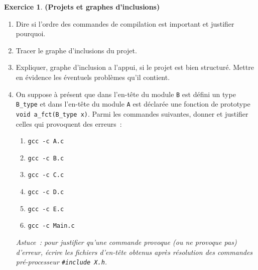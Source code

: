 \documentclass[12pt]{article}
\theoremstyle{definition}
\newtheorem{Exercice}{Exercice}
\newcommand{\Sol}[1]{}
\begin{document}
\begin{Exercice} {\bf (Projets et graphes d'inclusions)}
\begin{enumerate}
        \item Dire si l'ordre des commandes de compilation est important
        et justifier pourquoi.

        \Sol{Les six premières lignes commutent, seule la dernière est toujours
        la dernière. C'est l'éditeur de liens qui résout les symboles
        non encore connus, et c'est ce que fait la dernière ligne.}
        \smallskip

        \item Tracer le graphe d'inclusions du projet.

        \Sol{C'est le graphe à $6$ sommet où l'on a un arc de $x$ vers $y$
        si et seulement si il y a un include $y$ dans l'{\bf en-tête} de $x$
        (et non pas dans le .c).}
        \smallskip

        \item Expliquer, graphe d'inclusion a l'appui, si le projet
        est bien structuré. Mettre en évidence les éventuels problèmes
        qu'il contient.

        \Sol{Le projet est mal structuré car il y a un cycle 
        $A \to B \to D \to A$.}
        \smallskip

        \item On suppose à présent que dans l'en-tête du module {\tt B}
        est défini un type {\tt B\_type} et dans l'en-tête du module
        {\tt A} est déclarée une fonction de prototype
        {\tt void a\_fct(B\_type x)}. Parmi les commandes suivantes,
        donner et justifier celles qui provoquent des erreurs~:
        \begin{multicols}{2}
            \begin{enumerate}
                \item {\tt gcc -c A.c}
                \item {\tt gcc -c B.c}
                \item {\tt gcc -c C.c}
                \item {\tt gcc -c D.c}
                \item {\tt gcc -c E.c}
                \item {\tt gcc -c Main.c}
            \end{enumerate}
        \end{multicols}
        {\it Astuce~: pour justifier qu'une commande provoque (ou ne 
        provoque pas) d'erreur, écrire les fichiers d'en-tête obtenus 
        après résolution des commandes pré-processeur {\tt \#include X.h}.}


\end{enumerate}
\end{Exercice}
\end{document}
